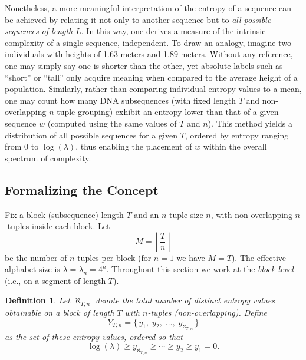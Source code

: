 \documentclass{article}
\newtheorem{Definition}{Definition}[section]
\theoremstyle{remark}
\begin{document}
Nonetheless, a more meaningful interpretation of the entropy of a sequence can be achieved by relating it not only to another sequence but to \emph{all possible sequences of length \(L\)}. In this way, one derives a measure of the intrinsic complexity of a single sequence, independent. To draw an analogy, imagine two individuals with heights of 1.63 meters and 1.89 meters. Without any reference, one may simply say one is shorter than the other, yet absolute labels such as “short” or “tall” only acquire meaning when compared to the average height of a population. Similarly, rather than comparing individual entropy values to a mean, one may count how many DNA subsequences (with fixed length \(T\) and non-overlapping \(n\)-tuple grouping) exhibit an entropy lower than that of a given sequence \(w\) (computed using the same values of \(T\) and \(n\)). This method yields a distribution of all possible sequences for a given \(T\), ordered by entropy ranging from \(0\) to \(\log(\lambda)\), thus enabling the placement of \(w\) within the overall spectrum of complexity.

\subsection{Formalizing the Concept}

Fix a block (subsequence) length \(T\) and an \(n\)-tuple size \(n\), with non-overlapping \(n\)-tuples inside each block. Let
\begin{equation}
M=\left\lfloor \frac{T}{n}\right\rfloor
\end{equation}
be the number of \(n\)-tuples per block (for \(n=1\) we have \(M=T\)). The effective alphabet size is \(\lambda=\lambda_n=4^n\). Throughout this section we work at the \emph{block level} (i.e., on a segment of length \(T\)).

\begin{Definition}\label{def:2.2}
Let \(\aleph_{T,n}\) denote the total number of distinct entropy values obtainable on a block of length \(T\) with \(n\)-tuples (non-overlapping). Define
\begin{equation}
Y_{T,n}=\{\,y_1,\;y_2,\;\ldots,\;y_{\aleph_{T,n}}\,\}
\end{equation}
as the set of these entropy values, ordered so that
\begin{equation}
\log(\lambda) \ge y_{\aleph_{T,n}} \ge \cdots \ge y_2 \ge y_1=0.
\end{equation}
\end{Definition}
\end{document}
